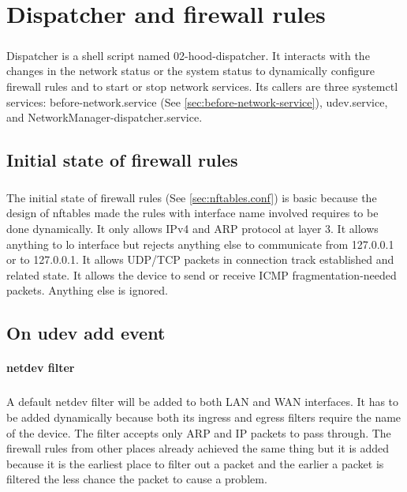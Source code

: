 \documentclass[mscthesis]{usiinfthesis}
\begin{document}
\chapter{Dispatcher and firewall rules}\label{cha:dispatcher}
\paragraph{}
Dispatcher is a shell script named 02-hood-dispatcher. It interacts with the changes in the network status or the system status to dynamically configure firewall rules and to start or stop network services. Its callers are three systemctl services: before-network.service (See \cref{sec:before-network-service}), udev.service, and NetworkManager-dispatcher.service.

\section{Initial state of firewall rules}
\paragraph{}
The initial state of firewall rules (See \cref{sec:nftables.conf}) is basic because the design of nftables made the rules with interface name involved requires to be done dynamically. It only allows IPv4 and ARP protocol at layer 3. It allows anything to lo interface but rejects anything else to communicate from 127.0.0.1 or to 127.0.0.1. It allows UDP/TCP packets in connection track established and related
state. It allows the device to send or receive ICMP fragmentation-needed packets. Anything else is ignored.

\section{On udev add event}
\subsubsection{netdev filter}
\paragraph{}
A default netdev filter will be added to both LAN and WAN interfaces. It has to be added dynamically because both its ingress and egress filters require the name of the device. The filter accepts only ARP and IP packets to pass through. The firewall rules from other places already achieved the same thing but it is added because it is the earliest place to filter out a packet and the earlier a packet is filtered the less chance the packet to cause a problem.
\end{document}
